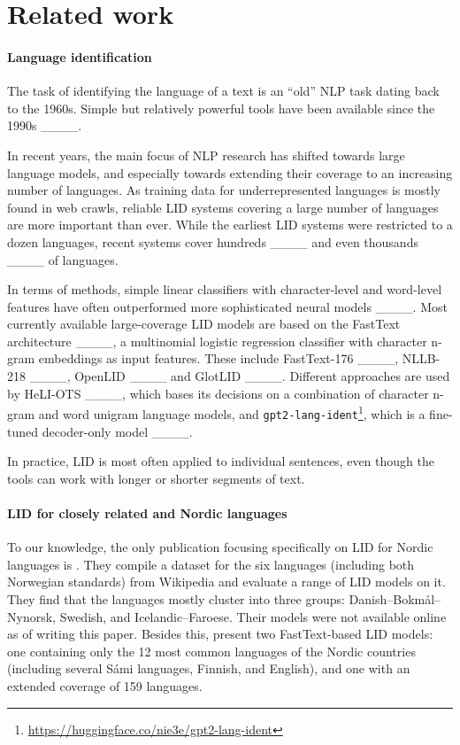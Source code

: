 \section{Related work}
\paragraph{Language identification} The task of identifying the language of a text is an ``old'' NLP task dating back to the 1960s. Simple but relatively powerful tools have been available since the 1990s ____.

In recent years, the main focus of NLP research has shifted towards large language models, and especially towards extending their coverage to an increasing number of languages. As training data for underrepresented languages is mostly found in web crawls, reliable LID systems covering a large number of languages are more important than ever. While the earliest LID systems were restricted to a dozen languages, recent systems cover hundreds ____ and even thousands ____ of languages.

In terms of methods, simple linear classifiers with character-level and word-level features have often outperformed more sophisticated neural models ____. Most currently available large-coverage LID models are based on the FastText architecture ____, a multinomial logistic regression classifier with character n-gram embeddings as input features. These include FastText-176 ____, NLLB-218 ____, OpenLID ____ and GlotLID ____. Different approaches are used by HeLI-OTS ____, which bases its decisions on a combination of character n-gram and word unigram language models, and \texttt{gpt2-lang-ident}\footnote{\url{https://huggingface.co/nie3e/gpt2-lang-ident}}, which is a fine-tuned decoder-only model ____.

In practice, LID is most often applied to individual sentences, even though the tools can work with longer or shorter segments of text.


\paragraph{LID for closely related and Nordic languages}

To our knowledge, the only publication focusing specifically on LID for Nordic languages is . They compile a dataset for the six languages (including both Norwegian standards) from Wikipedia and evaluate a range of LID models on it. They find that the languages mostly cluster into three groups: Danish--Bokmål--Nynorsk, Swedish, and Icelandic--Faroese. Their models were not available online as of writing this paper. Besides this,  present two FastText-based LID models: one containing only the 12 most common languages of the Nordic countries (including several Sámi languages, Finnish, and English), and one with an extended coverage of 159 languages.

